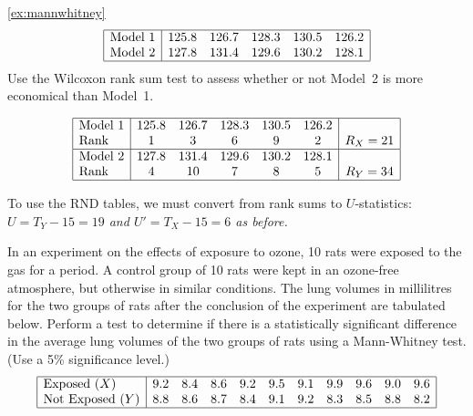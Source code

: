 \begin{examplecont}{\ref{ex:mannwhitney}}
\[\begin{array}{|l|ccccc|}\hline
\text{Model 1}	& 125.8	& 126.7	& 128.3	& 130.5	& 126.2 \\
\text{Model 2}	& 127.8 & 131.4	& 129.6	& 130.2	& 128.1 \\ \hline
\end{array}\]
Use the Wilcoxon rank sum test to assess whether or not Model~2 is more economical than Model~1.
\end{examplecont}

\begin{solution}
\[\begin{array}{|l|ccccc|c|}\hline
\text{Model 1}	& 125.8 & 126.7 & 128.3 & 130.5 & 126.2 	&  \\
\text{Rank} 		& 1	    & 3     & 6	   & 9     & 2     	& R_X = 21 \\ \hline
\text{Model 2}	& 127.8 & 131.4	& 129.6	& 130.2	& 128.1	& \\ 
\text{Rank}		& 4     & 10     & 7     & 8	   & 5     	& R_Y = 34 \\ \hline
\end{array}\]

To use the RND tables, we must convert from rank sums to $U$-statistics:
\bit
\it $U  = T_Y - 15 = 19$ and $U' = T_X - 15 = 6$ as before. 
\eit
\end{solution}

\begin{example}
In an experiment on the effects of exposure to ozone, 10 rats were exposed to the gas for a period. A control group of 10 rats were kept in an ozone-free atmosphere, but otherwise in similar conditions. The lung volumes in millilitres for the two groups of rats after the conclusion of the experiment are tabulated below. Perform a test to determine if there is a statistically significant difference in the average lung volumes of the two groups of rats using a Mann-Whitney test. (Use a 5\% significance level.)
\[\begin{array}{|l|cccccccccc|} \hline
\text{Exposed } (X)		& 9.2    & 8.4    & 8.6    & 9.2    & 9.5    & 9.1    & 9.9    & 9.6    & 9.0    & 9.6 \\
\text{Not Exposed } (Y)	& 8.8    & 8.6    & 8.7    & 8.4    & 9.1    & 9.2    & 8.3    & 8.5    & 8.8    & 8.2 \\ \hline
\end{array}\]
\end{example}

